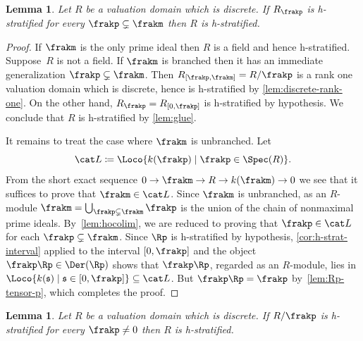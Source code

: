 \documentclass{amsart}
\numberwithin{equation}{section}%
\newtheorem{Lem}[equation]{Lemma}
\theoremstyle{remark}
\begin{document}
\begin{Lem}\label{lem:below}
	Let $R$ be a valuation domain which is discrete. If $R_\frakp$ is h-stratified for every $\frakp \subsetneq \frakm$ then $R$ is h-stratified.
\end{Lem}

\begin{proof}
	If $\frakm$ is the only prime ideal then $R$ is a field and hence h-stratified. Suppose~$R$ is not a field. If $\frakm$ is branched then it has an immediate generalization $\frakp \subsetneq \frakm$. Then $R_{[\frakp,\frakm]}=R/\frakp$ is a rank one valuation domain which is discrete, hence is h-stratified by \cref{lem:discrete-rank-one}. On the other hand, $R_\frakp = R_{[0,\frakp]}$ is h-stratified by hypothesis. We conclude that $R$ is h-stratified by \cref{lem:glue}.

	It remains to treat the case where $\frakm$ is unbranched. Let 
    \[
		\cat L \coloneqq \Loco{k(\frakp) \mid \frakp \in \Spec(R)}.
    \]
    From the short exact sequence $0 \to \frakm \to R \to k(\frakm) \to 0$ we see that it suffices to prove that $\frakm \in \cat L$. Since $\frakm$ is unbranched, as an $R$-module $\frakm = \bigcup_{\frakp \subsetneq \frakm} \frakp$ is the union of the chain of nonmaximal prime ideals. By~\cref{lem:hocolim}, we are reduced to proving that $\frakp \in \cat L$ for each $\frakp \subsetneq \frakm$. Since $\Rp$ is h-stratified by hypothesis, \cref{cor:h-strat-interval} applied to the interval $[0,\frakp]$ and the object $\frakp\Rp \in \Der(\Rp)$ shows that $\frakp\Rp$, regarded as an $R$-module, lies in $\Loco{k(\mathfrak{s}) \mid \mathfrak{s} \in [0,\frakp]} \subseteq \cat L$. But $\frakp\Rp = \frakp$ by~\cref{lem:Rp-tensor-p}, which completes the proof.
\end{proof}

\begin{Lem}\label{lem:above}
	Let $R$ be a valuation domain which is discrete. If $R/\frakp$ is h-stratified for every $\frakp\neq 0$ then $R$ is h-stratified.
\end{Lem}
\end{document}
